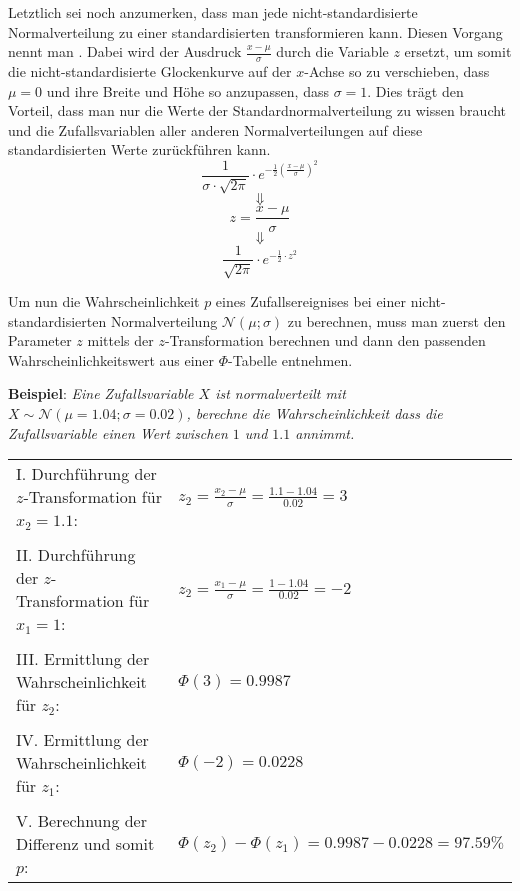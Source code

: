 \pagebreak


Letztlich sei noch anzumerken, dass man jede nicht-standardisierte Normalverteilung zu einer standardisierten transformieren kann. Diesen Vorgang nennt man . Dabei wird der Ausdruck $\frac{x - \mu}{\sigma}$ durch die Variable $z$ ersetzt, um somit die nicht-standardisierte Glockenkurve auf der $x$-Achse so zu verschieben, dass $\mu = 0$ und ihre Breite und H\"{o}he so anzupassen, dass $\sigma = 1$. Dies tr\"{a}gt den Vorteil, dass man nur die Werte der Standardnormalverteilung zu wissen braucht und die Zufallsvariablen aller anderen Normalverteilungen auf diese standardisierten Werte zur\"{u}ckf\"{u}hren kann. $$\frac{1}{\sigma \cdot \sqrt{2\pi}} \cdot e^{-\frac{1}{2}\left(\frac{x - \mu}{\sigma}\right)^2}$$ $$\Downarrow$$ $$z = \frac{x - \mu}{\sigma} $$ $$\Downarrow$$ $$\frac{1}{\sqrt{2\pi}} \cdot e^{-\frac{1}{2} \cdot z^2}$$

\pagebreak


Um nun die Wahrscheinlichkeit $p$ eines Zufallsereignises bei einer nicht-standardisierten Normalverteilung $\mathcal{N}(\mu; \sigma)$ zu berechnen, muss man zuerst den Parameter $z$ mittels der $z$-Transformation berechnen und dann den passenden Wahrscheinlichkeitswert aus einer $\Phi$-Tabelle entnehmen.

\textbf{Beispiel}: \emph{Eine Zufallsvariable $X$ ist normalverteilt mit $X \sim \mathcal{N}(\mu=1.04; \sigma=0.02)$, berechne die Wahrscheinlichkeit dass die Zufallsvariable einen Wert zwischen $1$ und $1.1$ annimmt.}

\begin{table}[h!]
	\begin{tabular}{l l}
	I. Durchf\"{u}hrung der $z$-Transformation f\"{u}r $x_{2} = 1.1$: & $z_{2} = \frac{x_{2} - \mu}{\sigma} = \frac{1.1 - 1.04}{0.02} = 3$
	\\ & \\
	II. Durchf\"{u}hrung der $z$-Transformation f\"{u}r $x_{1} = 1$: & $z_{2} = \frac{x_{1} - \mu}{\sigma} = \frac{1 - 1.04}{0.02} = -2$
	\\ & \\
	III. Ermittlung der Wahrscheinlichkeit f\"{u}r $z_{2}$: & $\Phi(3) = 0.9987$
	\\ & \\
	IV. Ermittlung der Wahrscheinlichkeit f\"{u}r $z_{1}$: & $\Phi(-2) = 0.0228$
	\\ & \\
	V. Berechnung der Differenz und somit $p$: & $\Phi(z_{2}) - \Phi(z_{1}) = 0.9987 - 0.0228 = 97.59\%$
	\end{tabular}
\end{table}

